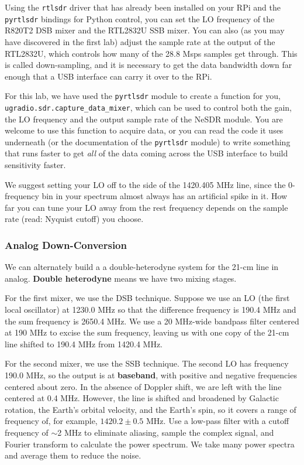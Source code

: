 \documentclass[11pt,preprint]{aastex}
\begin{document}
Using the {\tt rtlsdr} driver that has already been installed on your
RPi and the {\tt pyrtlsdr} bindings for Python control, you can set
the LO frequency of the R820T2 DSB mixer and the RTL2832U SSB mixer.
You can also (as you may have discovered in the first lab) adjust the
sample rate at the output of the RTL2832U, which controls how many of
the 28.8 Msps samples get through. This is called down-sampling, and
it is necessary to get the data bandwidth down far enough that a
USB interface can carry it over to the RPi.

For this lab, we have used the {\tt pyrtlsdr} module to create a
function for you, {\tt ugradio.sdr.capture\_data\_mixer}, which can be
used to control both the gain, the LO frequency and the output sample rate of
the NeSDR module. You are welcome to use this function to acquire data,
or you can read the code it uses underneath (or the documentation of
the {\tt pyrtlsdr} module) to write something that runs faster to
get {\it all} of the data coming across the USB interface to build
sensitivity faster.

We suggest setting your LO off to the side of the 1420.405 MHz line,
since the 0-frequency bin in your spectrum almost always has an
artificial spike in it. How far you can tune your LO away from the
rest frequency depends on the sample rate (read: Nyquist cutoff) you
choose.

\subsubsection{Analog Down-Conversion}

\noindent
We can alternately build a a double-heterodyne system 
for the 21-cm line in analog.
{\bf Double heterodyne} means we have two mixing stages.

For the first mixer, we use the DSB technique. Suppose we
  use an LO (the first local oscillator) at 1230.0 MHz so that the
  difference frequency is 190.4 MHz and the sum frequency is 2650.4 MHz.
  We use a 20 MHz-wide bandpass filter centered at 190 MHz to excise
  the sum frequency, leaving us with one copy of the 21-cm line
  shifted to 190.4 MHz from 1420.4 MHz.

For the second mixer, we use the SSB technique. The second
  LO has frequency 190.0 MHz, so the output is at {\bf baseband},
  with positive and negative frequencies centered about zero. In the
  absence of Doppler shift, we are left with the line centered at 0.4
  MHz. However, the line is shifted and broadened by Galactic rotation,
  the Earth's orbital velocity, and the Earth's spin, so it covers a range of frequency
  of, for example, $1420.2 \pm 0.5$ MHz. Use a low-pass filter with a
  cutoff frequency of $\sim$2 MHz to
  eliminate aliasing, sample the complex signal, and Fourier transform
  to calculate the power spectrum. We take many power spectra and
  average them to reduce the noise.
\end{document}
